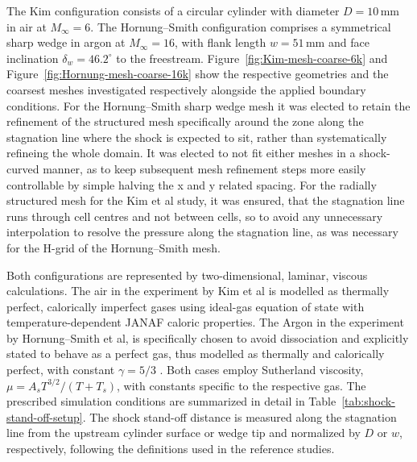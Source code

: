 The Kim configuration consists of a circular cylinder with diameter
\(D=10\,\mathrm{mm}\) in air at \(M_\infty=6\). The Hornung--Smith
configuration comprises a symmetrical sharp wedge in argon at
\(M_\infty=16\), with flank length \(w=51\,\mathrm{mm}\) and face
inclination \(\delta_w=46.2^\circ\) to the freestream. Figure~\ref{fig:Kim-mesh-coarse-6k} and Figure~\ref{fig:Hornung-mesh-coarse-16k} show the respective geometries and the coarsest meshes investigated respectively alongside the applied boundary conditions. For the Hornung--Smith sharp wedge mesh it was elected to retain the refinement of the structured mesh specifically around the zone along the stagnation line where the shock is expected to sit, rather than systematically refineing the whole domain. It was elected to not fit either meshes in a shock-curved manner, as to keep subsequent mesh refinement steps more easily controllable by simple halving the x and y related spacing. For the radially structured mesh for the Kim et al study, it was ensured, that the stagnation line runs through cell centres and not between cells, so to avoid any unnecessary interpolation to resolve the pressure along the stagnation line, as was necessary for the H-grid of the Hornung--Smith mesh. 
\par\medskip

Both configurations are represented by two-dimensional, laminar, viscous calculations. The air in the experiment by Kim et al is modelled as thermally perfect, calorically imperfect gases using ideal-gas equation of state with temperature-dependent JANAF caloric
properties. The Argon in the experiment by Hornung--Smith et al, is specifically chosen to avoid dissociation and explicitly stated to behave as a perfect gas, thus modelled as thermally and calorically perfect, with constant \(\gamma=5/3\) \cite{HornungSmith1979ShockDetachment}. Both cases employ Sutherland viscosity, \(\mu=A_sT^{3/2}/(T+T_s)\), with constants specific to the respective gas. The prescribed simulation conditions are
summarized in detail in Table~\ref{tab:shock-stand-off-setup}. The shock stand-off distance is measured along the stagnation line from the upstream cylinder surface or wedge tip and normalized by \(D\) or \(w\), respectively, following the definitions used in the reference studies.

